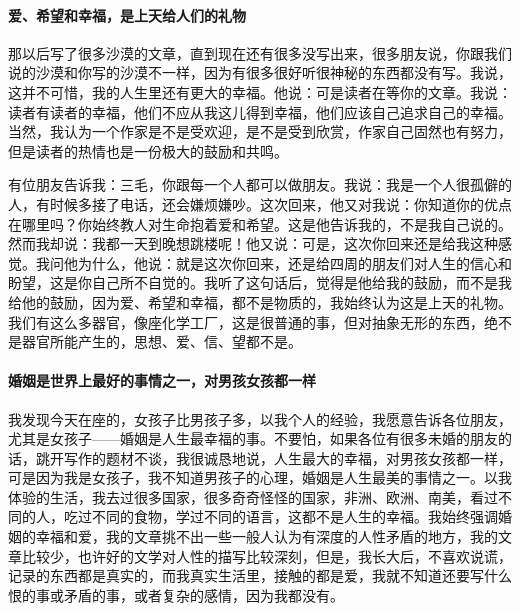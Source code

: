 \paragraph*{爱、希望和幸福，是上天给人们的礼物}
\par 那以后写了很多沙漠的文章，直到现在还有很多没写出来，很多朋友说，你跟我们说的沙漠和你写的沙漠不一样，因为有很多很好听很神秘的东西都没有写。我说，这并不可惜，我的人生里还有更大的幸福。他说：可是读者在等你的文章。我说：读者有读者的幸福，他们不应从我这儿得到幸福，他们应该自己追求自己的幸福。当然，我认为一个作家是不是受欢迎，是不是受到欣赏，作家自己固然也有努力，但是读者的热情也是一份极大的鼓励和共鸣。
\par 有位朋友告诉我：三毛，你跟每一个人都可以做朋友。我说：我是一个人很孤僻的人，有时候多接了电话，还会嫌烦嫌吵。这次回来，他又对我说：你知道你的优点在哪里吗？你始终教人对生命抱着爱和希望。这是他告诉我的，不是我自己说的。然而我却说：我都一天到晚想跳楼呢！他又说：可是，这次你回来还是给我这种感觉。我问他为什么，他说：就是这次你回来，还是给四周的朋友们对人生的信心和盼望，这是你自己所不自觉的。我听了这句话后，觉得是他给我的鼓励，而不是我给他的鼓励，因为爱、希望和幸福，都不是物质的，我始终认为这是上天的礼物。我们有这么多器官，像座化学工厂，这是很普通的事，但对抽象无形的东西，绝不是器官所能产生的，思想、爱、信、望都不是。

\paragraph*{婚姻是世界上最好的事情之一，对男孩女孩都一样}
\par 我发现今天在座的，女孩子比男孩子多，以我个人的经验，我愿意告诉各位朋友，尤其是女孩子——婚姻是人生最幸福的事。不要怕，如果各位有很多未婚的朋友的话，跳开写作的题材不谈，我很诚恳地说，人生最大的幸福，对男孩女孩都一样，可是因为我是女孩子，我不知道男孩子的心理，婚姻是人生最美的事情之一。以我体验的生活，我去过很多国家，很多奇奇怪怪的国家，非洲、欧洲、南美，看过不同的人，吃过不同的食物，学过不同的语言，这都不是人生的幸福。我始终强调婚姻的幸福和爱，我的文章挑不出一些一般人认为有深度的人性矛盾的地方，我的文章比较少，也许好的文学对人性的描写比较深刻，但是，我长大后，不喜欢说谎，记录的东西都是真实的，而我真实生活里，接触的都是爱，我就不知道还要写什么恨的事或矛盾的事，或者复杂的感情，因为我都没有。
